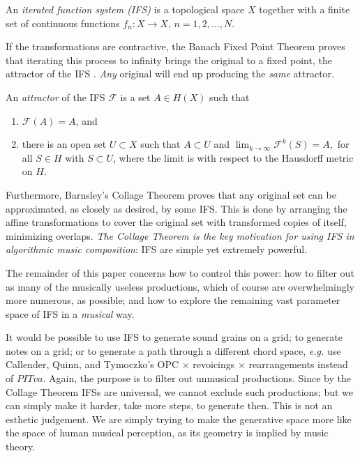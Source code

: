 \documentclass[english,11pt,letterpaper,onecolumn]{scrartcl}
\numberwithin{equation}{section}
\newcommand{\cF}{\mathcal{F}}
\begin{document}
    An \emph{iterated function system (IFS)} is a topological space $X$
    together with a finite set of continuous functions $f_{n}:X\rightarrow X$, 
    $n=1,2,\dots,N$.
    
    If the transformations are contractive, the Banach Fixed Point Theorem proves 
    that iterating this process to infinity brings the original to a fixed point, 
    the attractor of the IFS \cite{chaosandfractals, barnsley1985iterated, 
        10.2307/24893080, fractalseverywhere}. \textit{Any} original will end up 
    producing the \textit{same} attractor. 
    
    An \emph{attractor} of the IFS $\mathcal{F}$ is a set
    $A\in H(X)$ such that
    
    \begin{enumerate}
        \item $\cF(A)=A$, and
        
        \item there is an open set $U\subset X$ such that $A\subset U$ and
        $\lim_{k\rightarrow\infty}\cF^{k}(S)=A,$ for all $S\in H$ with $S\subset U$,
        where the limit is with respect to the Hausdorff metric on $H$.
    \end{enumerate}
    
    
    Furthermore, Barnsley's Collage Theorem \cite{barnsley:1986:solution} proves 
    that any original set can be approximated, as closely as desired, by some IFS. 
    This is done by arranging the affine transformations to cover the original set 
    with transformed copies of itself, minimizing overlaps. \textit{The Collage 
        Theorem is the key motivation for using IFS in algorithmic music composition}: 
    IFS are simple yet extremely powerful. 
    
    The remainder of this paper concerns how to control this power: how to 
    filter out as many of the musically useless productions, which of course are 
    overwhelmingly more numerous, as possible; and how to explore the 
    remaining vast parameter space of IFS in a \textit{musical} way.
    
    It would be possible to use IFS to generate sound grains on a grid; to 
    generate notes on a grid; or to generate a path through a different chord 
    space, \textit{e.g.} use Callender, Quinn, and Tymoczko's OPC $\times$ 
    revoicings 
    $\times$ rearrangements instead of $PITva$. Again, the purpose is to filter 
    out unmusical productions. Since by the Collage Theorem IFSs are universal, we 
    cannot exclude such productions; but we can simply make it harder, take more 
    steps, to generate then. This is not an esthetic judgement. We are 
    simply trying to make the generative space more like the space of human 
    musical perception, as its geometry is implied by music theory.
    
\end{document}
